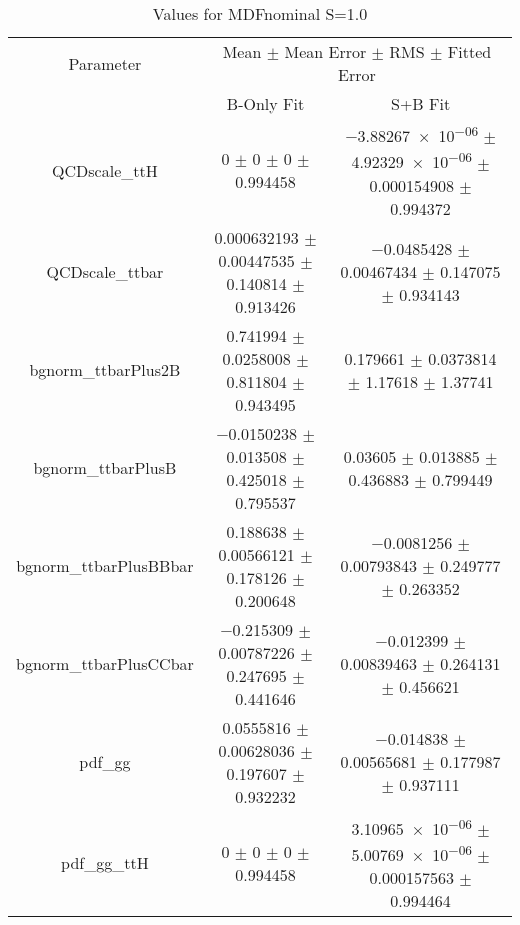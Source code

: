 \begin{table}
\centering
\caption{Values for MDFnominal S=1.0}
\begin{tabular}{ccc}
\toprule
Parameter & \multicolumn{2}{c}{Mean $\pm$ Mean Error $\pm$ RMS $\pm$ Fitted Error}\\
 & B-Only Fit & S+B Fit\\
\midrule
QCDscale\_ttH & \num{0} $\pm$ \num{0} $\pm$ \num{0} $\pm$ \num{0.994458} & \num{-3.88267e-06} $\pm$ \num{4.92329e-06} $\pm$ \num{0.000154908} $\pm$ \num{0.994372}\\
QCDscale\_ttbar & \num{0.000632193} $\pm$ \num{0.00447535} $\pm$ \num{0.140814} $\pm$ \num{0.913426} & \num{-0.0485428} $\pm$ \num{0.00467434} $\pm$ \num{0.147075} $\pm$ \num{0.934143}\\
bgnorm\_ttbarPlus2B & \num{0.741994} $\pm$ \num{0.0258008} $\pm$ \num{0.811804} $\pm$ \num{0.943495} & \num{0.179661} $\pm$ \num{0.0373814} $\pm$ \num{1.17618} $\pm$ \num{1.37741}\\
bgnorm\_ttbarPlusB & \num{-0.0150238} $\pm$ \num{0.013508} $\pm$ \num{0.425018} $\pm$ \num{0.795537} & \num{0.03605} $\pm$ \num{0.013885} $\pm$ \num{0.436883} $\pm$ \num{0.799449}\\
bgnorm\_ttbarPlusBBbar & \num{0.188638} $\pm$ \num{0.00566121} $\pm$ \num{0.178126} $\pm$ \num{0.200648} & \num{-0.0081256} $\pm$ \num{0.00793843} $\pm$ \num{0.249777} $\pm$ \num{0.263352}\\
bgnorm\_ttbarPlusCCbar & \num{-0.215309} $\pm$ \num{0.00787226} $\pm$ \num{0.247695} $\pm$ \num{0.441646} & \num{-0.012399} $\pm$ \num{0.00839463} $\pm$ \num{0.264131} $\pm$ \num{0.456621}\\
pdf\_gg & \num{0.0555816} $\pm$ \num{0.00628036} $\pm$ \num{0.197607} $\pm$ \num{0.932232} & \num{-0.014838} $\pm$ \num{0.00565681} $\pm$ \num{0.177987} $\pm$ \num{0.937111}\\
pdf\_gg\_ttH & \num{0} $\pm$ \num{0} $\pm$ \num{0} $\pm$ \num{0.994458} & \num{3.10965e-06} $\pm$ \num{5.00769e-06} $\pm$ \num{0.000157563} $\pm$ \num{0.994464}\\
\bottomrule
\end{tabular}
\end{table}